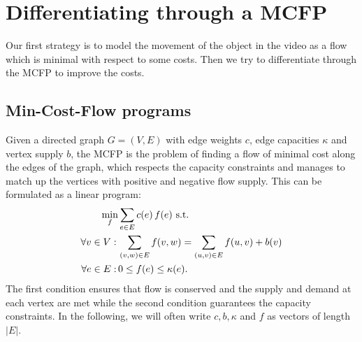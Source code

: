 \documentclass{article}
\begin{document}
\section{Differentiating through a MCFP}\label{diff_MCFP}
Our first strategy is to model the movement of the object in the video as a flow which is minimal with respect to some costs. Then we try to differentiate through the MCFP to improve the costs.
\subsection{Min-Cost-Flow programs}
Given a directed graph $G=(V,E)$ with edge weights $c$, edge capacities $\kappa$ and vertex supply $b$, the MCFP is the problem of finding a flow of minimal cost along the edges of the graph, which respects the capacity constraints and manages to match up the vertices with positive and negative flow supply. This can be formulated as a linear program:
\begin{align}\label{MCFP}
\min_f &\sum_{e \in E} c(e)\,f(e) \textnormal{ s.t.}\nonumber\\
\forall v \in V: \,&\sum_{(v,w) \in E} f(v,w) = \sum_{(u,v) \in E} f(u,v) + b(v) \\
\forall	e \in E: \,&0 \leq f(e) \leq \kappa(e). \nonumber
\end{align}
The first condition ensures that flow is conserved and the supply and demand at each vertex are met while the second condition guarantees the capacity constraints. In the following, we will often write $c, b, \kappa$ and $f$ as vectors of length $|E|$.
\end{document}
